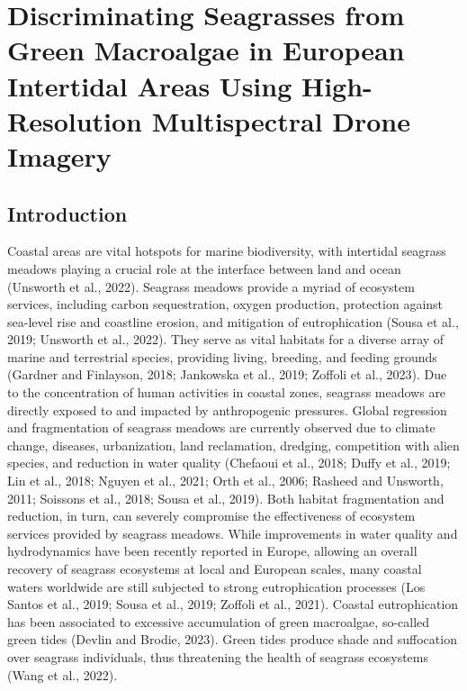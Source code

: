 \documentclass[
  letterpaper,
  11pt,
  english,
  singlespacing,
  headsepline]{MastersDoctoralThesis}
\newcommand{\chaptertopimage}{Chapter1/img/seagrasses.png}
\newcommand{\chapterbottomimage}{Chapter1/img/seagrasses.png}
\begin{document}
\renewcommand{\chaptertopimage}{Chapter3/img/top.png}
\renewcommand{\chapterbottomimage}{Chapter3/img/bottom.png}

\newpage\null\thispagestyle{empty}\newpage


\chapter{Discriminating Seagrasses from Green Macroalgae in European
Intertidal Areas Using High-Resolution Multispectral Drone
Imagery}\label{discriminating-seagrasses-from-green-macroalgae-in-european-intertidal-areas-using-high-resolution-multispectral-drone-imagery}

\begin{spacing}{1.5}

\section{Introduction}\label{introduction-2}

Coastal areas are vital hotspots for marine biodiversity, with
intertidal seagrass meadows playing a crucial role at the interface
between land and ocean (Unsworth et al., 2022). Seagrass meadows provide
a myriad of ecosystem services, including carbon sequestration, oxygen
production, protection against sea-level rise and coastline erosion, and
mitigation of eutrophication (Sousa et al., 2019; Unsworth et al.,
2022). They serve as vital habitats for a diverse array of marine and
terrestrial species, providing living, breeding, and feeding grounds
(Gardner and Finlayson, 2018; Jankowska et al., 2019; Zoffoli et al.,
2023). Due to the concentration of human activities in coastal zones,
seagrass meadows are directly exposed to and impacted by anthropogenic
pressures. Global regression and fragmentation of seagrass meadows are
currently observed due to climate change, diseases, urbanization, land
reclamation, dredging, competition with alien species, and reduction in
water quality (Chefaoui et al., 2018; Duffy et al., 2019; Lin et al.,
2018; Nguyen et al., 2021; Orth et al., 2006; Rasheed and Unsworth,
2011; Soissons et al., 2018; Sousa et al., 2019). Both habitat
fragmentation and reduction, in turn, can severely compromise the
effectiveness of ecosystem services provided by seagrass meadows. While
improvements in water quality and hydrodynamics have been recently
reported in Europe, allowing an overall recovery of seagrass ecosystems
at local and European scales, many coastal waters worldwide are still
subjected to strong eutrophication processes (Los Santos et al., 2019;
Sousa et al., 2019; Zoffoli et al., 2021). Coastal eutrophication has
been associated to excessive accumulation of green macroalgae, so-called
green tides (Devlin and Brodie, 2023). Green tides produce shade and
suffocation over seagrass individuals, thus threatening the health of
seagrass ecosystems (Wang et al., 2022).


\end{spacing}
\end{document}
